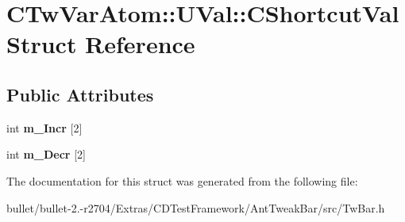 \hypertarget{struct_c_tw_var_atom_1_1_u_val_1_1_c_shortcut_val}{\section{C\+Tw\+Var\+Atom\+:\+:U\+Val\+:\+:C\+Shortcut\+Val Struct Reference}
\label{struct_c_tw_var_atom_1_1_u_val_1_1_c_shortcut_val}
}
\subsection*{Public Attributes}
\begin{DoxyCompactItemize}
\item 
\hypertarget{struct_c_tw_var_atom_1_1_u_val_1_1_c_shortcut_val_af1a6095bcb599335ba3171af245ecee4}{int {\bfseries m\+\_\+\+Incr} \mbox{[}2\mbox{]}}\label{struct_c_tw_var_atom_1_1_u_val_1_1_c_shortcut_val_af1a6095bcb599335ba3171af245ecee4}

\item 
\hypertarget{struct_c_tw_var_atom_1_1_u_val_1_1_c_shortcut_val_a9dd37ca57bb2608b53eee6250636dc9a}{int {\bfseries m\+\_\+\+Decr} \mbox{[}2\mbox{]}}\label{struct_c_tw_var_atom_1_1_u_val_1_1_c_shortcut_val_a9dd37ca57bb2608b53eee6250636dc9a}

\end{DoxyCompactItemize}


The documentation for this struct was generated from the following file\+:\begin{DoxyCompactItemize}
\item 
bullet/bullet-\/2.-\/r2704/\+Extras/\+C\+D\+Test\+Framework/\+Ant\+Tweak\+Bar/src/Tw\+Bar.\+h\end{DoxyCompactItemize}
